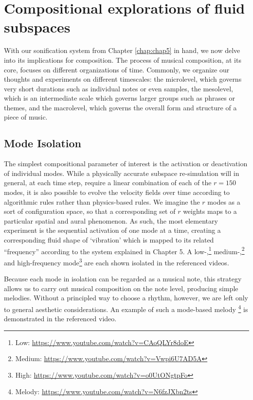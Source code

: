\chapter[Compositional exploration of fluid subspaces]{Compositional explorations of fluid subspaces}
\label{chap:chap6}

With our sonification system from Chapter \ref{chap:chap5} in hand, we now delve into its implications for composition. The process of musical composition, at its core, focuses on different
organizations of time. Commonly, we organize our thoughts and experiments on different timescales: the microlevel, which governs very short durations such as individual notes
or even samples, the mesolevel, which is an intermediate scale which governs larger groups such as phrases or themes, and the macrolevel, which governs the overall form and structure of a piece of music. 

\section{Mode Isolation}
The simplest compositional parameter of interest is the activation or deactivation of individual modes. While a physically accurate subspace re-simulation will in general, at each time step, require a linear combination of each of the $r = 150$ modes, it is also possible to evolve the velocity fields over time according to algorithmic rules rather than physics-based rules. We imagine the $r$ modes as a sort of configuration space, so that a corresponding set of $r$ weights maps to a particular spatial and aural phenomenon. As such, the most elementary experiment is the sequential activation of one mode at a time, creating a corresponding fluid shape of `vibration' which is mapped to its related ``frequency'' according to the system explained in Chapter 5. A low-,\footnote{Low: \url{https://www.youtube.com/watch?v=CAoQLYr8doE}}  medium-,\footnote{Medium: \url{https://www.youtube.com/watch?v=Vwpi6U7AD5A}} and high-frequency mode\footnote{High: \url{https://www.youtube.com/watch?v=o0UtONgtpFo}} are each shown isolated in the referenced videos. 

Because each mode in isolation can be regarded as a musical note, this strategy allows us to carry out musical composition on the note level, producing simple melodies. Without a principled way to choose a rhythm,
however, we are left only to general aesthetic considerations. An example of such a mode-based melody \footnote{Melody: \url{https://www.youtube.com/watch?v=N6fzJXbn2ts}} is demonstrated in the referenced video.

